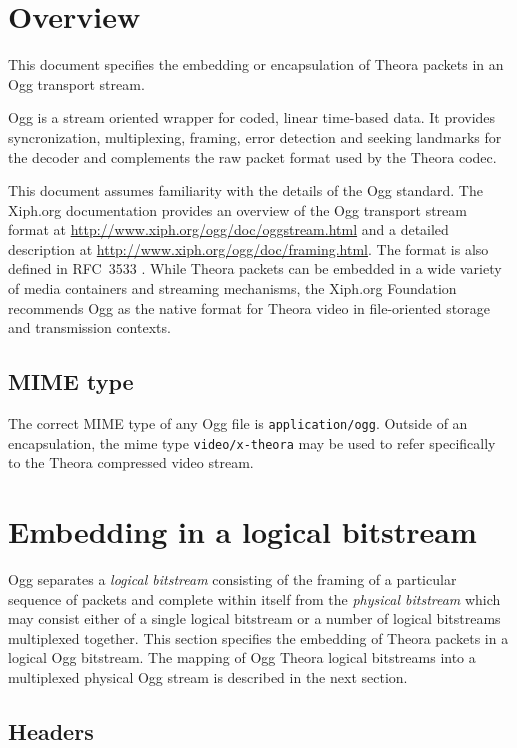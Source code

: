 \documentclass[9pt,letterpaper]{book}
\numberwithin{equation}{chapter}
\numberwithin{figure}{chapter}
\numberwithin{table}{chapter}
\begin{document}
\section{Overview}

This document specifies the embedding or encapsulation of Theora packets
 in an Ogg transport stream.

Ogg is a stream oriented wrapper for coded, linear time-based data.
It provides syncronization, multiplexing, framing, error detection and
 seeking landmarks for the decoder and complements the raw packet format
 used by the Theora codec.

This document assumes familiarity with the details of the Ogg standard.
The Xiph.org documentation provides an overview of the Ogg transport stream
 format at \url{http://www.xiph.org/ogg/doc/oggstream.html} and a detailed
 description at \url{http://www.xiph.org/ogg/doc/framing.html}.
The format is also defined in RFC~3533 \cite{rfc3533}.
While Theora packets can be embedded in a wide variety of media
 containers and streaming mechanisms, the Xiph.org Foundation
 recommends Ogg as the native format for Theora video in file-oriented
 storage and transmission contexts.

\subsection{MIME type}

The correct MIME type of any Ogg file is {\tt application/ogg}.
Outside of an encapsulation, the mime type {\tt video/x-theora} may
 be used to refer specifically to the Theora compressed video stream.

\section{Embedding in a logical bitstream}

Ogg separates a {\em logical bitstream} consisting of the framing of
 a particular sequence of packets and complete within itself from
 the {\em physical bitstream} which may consist either of a single
 logical bitstream or a number of logical bitstreams multiplexed
 together.
This section specifies the embedding of Theora packets in a logical Ogg
 bitstream.
The mapping of Ogg Theora logical bitstreams into a multiplexed physical Ogg
 stream is described in the next section.

\subsection{Headers}
\end{document}
